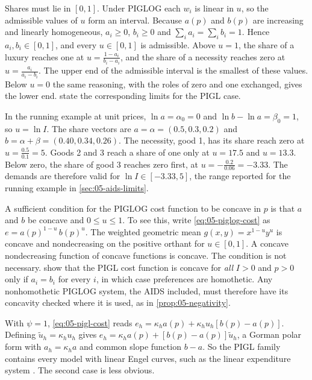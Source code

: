 Shares must lie in $[0, 1]$. Under PIGLOG each $w_i$ is linear in $u$, so the admissible values of $u$
form an interval. Because $a(p)$ and $b(p)$ are increasing and linearly homogeneous, $a_i \ge 0$, $b_i
\ge 0$ and $\sum_i a_i = \sum_i b_i = 1$. Hence $a_i, b_i \in [0,1]$, and every $u \in [0,1]$ is
admissible. Above $u = 1$, the share of a luxury reaches one at $u = \frac{1 - a_i}{b_i - a_i}$, and the
share of a necessity reaches zero at $u = \frac{a_i}{a_i - b_i}$. The upper end of the admissible
interval is the smallest of these values. Below $u = 0$ the same reasoning, with the roles of zero and
one exchanged, gives the lower end. \citet[p.~324]{DeatonMuellbauer1980a} state the corresponding limits
for the PIGL case.

In the running example at unit prices, $\ln a = \alpha_0 = 0$ and $\ln b - \ln a = \beta_0 = 1$, so $u =
\ln I$. The share vectors are $a = \alpha = (0.5, 0.3, 0.2)$ and $b = \alpha + \beta = (0.40, 0.34, 0.26)$.
The necessity, good 1, has its share reach zero at $u = \frac{0.5}{0.1} = 5$. Goods 2 and 3 reach a share
of one only at $u = 17.5$ and $u = 13.3$. Below zero, the share of good 3 reaches zero first, at $u =
-\frac{0.2}{0.06} = -3.33$. The demands are therefore valid for $\ln I \in [-3.33, 5]$, the range reported
for the running example in \cref{sec:05-aids-limits}.

A sufficient condition for the PIGLOG cost function to be concave in $p$ is that $a$ and $b$ be concave
and $0 \le u \le 1$. To see this, write \eqref{eq:05-piglog-cost} as $e = a(p)^{1-u}\, b(p)^{u}$. The
weighted geometric mean $g(x, y) = x^{1-u}y^{u}$ is concave and nondecreasing on the positive orthant for
$u \in [0, 1]$. A concave nondecreasing function of concave functions is concave. The condition is not
necessary. \citet[p.~324]{DeatonMuellbauer1980a} show that the PIGL cost function is concave for
\emph{all} $I > 0$ and $p > 0$ only if $a_i = b_i$ for every $i$, in which case preferences are
homothetic. Any nonhomothetic PIGLOG system, the AIDS included, must therefore have its concavity checked
where it is used, as in \cref{prop:05-negativity}.

With $\psi = 1$, \eqref{eq:05-pigl-cost} reads $e_h = \kappa_h a(p) + \kappa_h u_h[b(p) - a(p)]$. Defining
$\tilde u_h = \kappa_h u_h$ gives $e_h = \kappa_h a(p) + [b(p) - a(p)]\tilde u_h$, a Gorman polar form with
$a_h = \kappa_h a$ and common slope function $b - a$. So the PIGL family contains every model with linear
Engel curves, such as the linear expenditure system \citep[p.~324]{DeatonMuellbauer1980a}. The second
case is less obvious.

